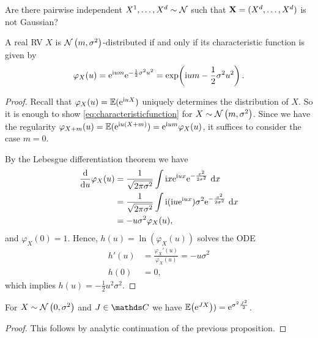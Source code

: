 \begin{ex}
	Are there pairwise independent
	\(X^1, \dots, X^d \sim \mathcal{N}\)
	such that \(\mathbf{X} = (X^d, \dots, X^d)\) is not Gaussian?
\end{ex}

\begin{prop}
A real RV $X$ is $\mathcal{N}\left(m,\sigma^2\right)$-distributed if and only if
its characteristic function is given by
\begin{align}\label{eq:characteristicfunction}
	\varphi_X(u)
	= \mathrm{e}^{\mathrm{i} um}\mathrm{e}^{-\frac{1}{2}\sigma^2u^2}
	= \exp\!\left(\mathrm{i} um - \frac12\sigma^2u^2\right).
\end{align}
\end{prop}

\begin{proof}
Recall that $\varphi_X(u) = \E[norm]{\e^{\i uX}}$ uniquely determines
the distribution of $X$.
So it is enough to show \eqref{eq:characteristicfunction}
for $X \sim \mathcal{N}\left(m,\sigma^2\right)$.
Since we have the regularity
$\varphi_{X+m}(u) = \E[norm]{\e^{\i u(X+m)}}=\e^{\i um}\varphi_X(u)$,
it suffices to consider the case $m=0$.

By the Lebesgue differentiation theorem we have
\begin{align*}
\frac{\mathrm{d}}{\mathrm{d}u}\varphi_X(u)&=\frac{1}{\sqrt{2\pi \sigma^2}} \int \mathrm{i} x\mathrm{e}^{\mathrm{i} ux}\mathrm{e}^{-\frac{x^2}{2 \sigma^2}}~\mathrm{d}x\\
&=\frac{1}{\sqrt{2 \pi \sigma^2}} \int \mathrm{i} (\mathrm{i} u \mathrm{e}^{\mathrm{i} ux})\sigma^2 \mathrm{e}^{-\frac{x^2}{2 \sigma^2}}~\mathrm{d}x\\
&=-u \sigma^2 \varphi_X(u),
\end{align*}
and $\varphi_X(0)=1$.
Hence, $h(u)=\ln(\varphi_X(u))$ solves the ODE
\begin{align*}
	h'(u) &= \frac{\varphi_X'(u)}{\varphi_X(u)}=-u \sigma^2\\
	h(0)  &= 0,
\end{align*}
which implies $h(u)=-\frac{1}{2}u^2\sigma^2$.
\end{proof}

\begin{cor}
For $X \sim \mathcal{N}\left(0,\sigma^2\right)$ and $J\in \C$ we have $\E{\e^{JX}})=\e^{\sigma^2 \frac{J^2}{2}}$.
\end{cor}
\begin{proof}
This follows by analytic continuation of the previous proposition.
\end{proof}

